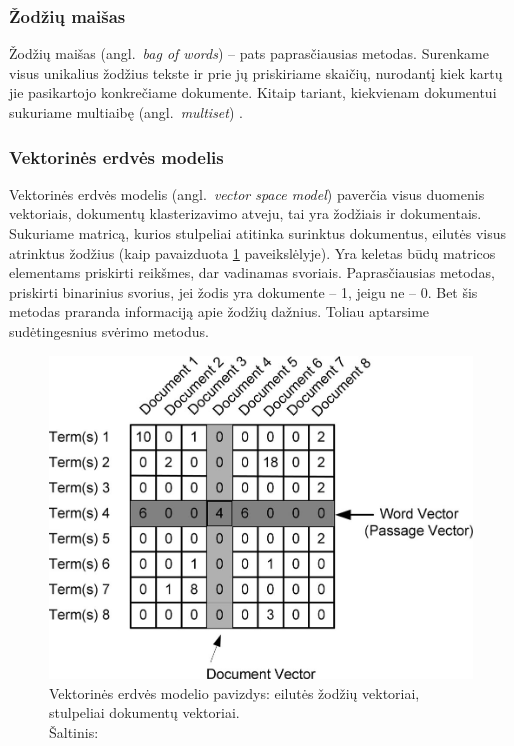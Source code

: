 \documentclass{VUMIFInfKursinis}
\newcommand{\ltang}[2]{#1 (angl.\  \textit{#2}) }
\begin{document}
\subsubsection{Žodžių maišas}

\ltang{Žodžių maišas}{bag of words} – pats paprasčiausias
metodas. Surenkame visus unikalius žodžius tekste ir prie jų priskiriame
skaičių, nurodantį kiek kartų jie pasikartojo konkrečiame dokumente.
Kitaip tariant, kiekvienam dokumentui sukuriame \ltang{multiaibę}{multiset}.





\subsubsection{Vektorinės erdvės modelis}

\ltang{Vektorinės erdvės modelis}{vector space model} paverčia
visus duomenis vektoriais, dokumentų klasterizavimo atveju, tai yra
žodžiais ir dokumentais. Sukuriame matricą, kurios stulpeliai atitinka
surinktus dokumentus, eilutės visus atrinktus žodžius (kaip pavaizduota \ref{vec} paveikslėlyje). Yra keletas
būdų matricos elementams priskirti reikšmes, dar vadinamas svoriais.
Paprasčiausias metodas, priskirti binarinius svorius, jei žodis yra
dokumente – 1, jeigu ne – 0. Bet šis metodas praranda informaciją apie
žodžių dažnius. Toliau aptarsime sudėtingesnius svėrimo metodus.

\begin{figure}[H]
	\centering
	\includegraphics[scale=0.3]{img/VSM}
	\caption{Vektorinės erdvės modelio pavizdys: eilutės žodžių vektoriai, stulpeliai dokumentų vektoriai. \\
	Šaltinis: \cite{marksberry2014employee}}
  \label{vec}
\end{figure}
\end{document}
